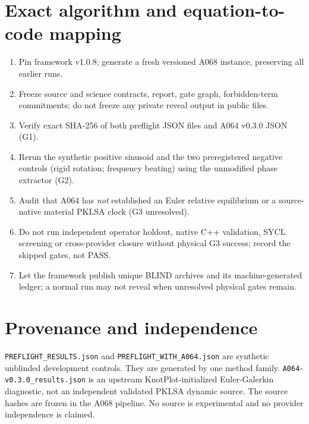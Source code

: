 \documentclass[11pt,a4paper]{article}
\begin{document}
\section{Exact algorithm and equation-to-code mapping}
\begin{enumerate}
\item Pin framework v1.0.8; generate a fresh versioned A068 instance, preserving all earlier runs.
\item Freeze source and science contracts, report, gate graph, forbidden-term commitments; do not freeze any private reveal output in public files.
\item Verify exact SHA-256 of both preflight JSON files and A064 v0.3.0 JSON (G1).
\item Rerun the synthetic positive sinusoid and the two preregistered negative controls (rigid rotation; frequency beating) using the unmodified phase extractor (G2).
\item Audit that A064 has \emph{not} established an Euler relative equilibrium or a source-native material PKLSA clock (G3 unresolved).
\item Do not run independent operator holdout, native C++ validation, SYCL screening or cross-provider closure without physical G3 success; record the skipped gates, not PASS.
\item Let the framework publish unique BLIND archives and its machine-generated ledger; a normal run may not reveal when unresolved physical gates remain.
\end{enumerate}

\section{Provenance and independence}
\texttt{PREFLIGHT\_RESULTS.json} and \texttt{PREFLIGHT\_WITH\_A064.json} are synthetic unblinded development controls. They are generated by one method family. \texttt{A064-v0.3.0\_results.json} is an upstream KnotPlot-initialized Euler-Galerkin diagnostic, not an independent validated PKLSA dynamic source. The source hashes are frozen in the A068 pipeline. No source is experimental and no provider independence is claimed.

\end{document}
